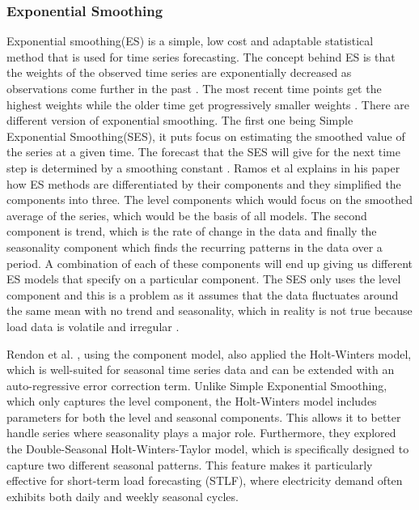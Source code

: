  
 
 \subsubsection{Exponential Smoothing }
 Exponential smoothing(ES) is a simple, low cost and adaptable statistical method that is used for time series forecasting. The concept behind ES is that the weights of the observed time series are exponentially decreased as observations come further in the past \cite{ramos2015performance}.
 The most recent time points get the highest weights while the older time get progressively smaller weights \cite{ramos2015performance}. There are different version of exponential smoothing. The first one being Simple Exponential Smoothing(SES), it puts focus on estimating the smoothed value of the series at a given time. The forecast that the SES will give for the next time step is determined by a smoothing constant \cite{ahmed2020review}. Ramos et al \cite{ramos2015performance} explains in his paper how ES methods are differentiated by their components and they simplified the components into three. The level components which would focus on the smoothed average of the series, which would be the basis of all models. The second component is trend, which is the rate of change in the data and finally the seasonality component which finds the recurring patterns in the data over a period. A combination of each of these components will end up giving us different ES models that specify on a particular component. The SES only uses the level component and this is a problem as it assumes that the data fluctuates around the same mean with no trend and seasonality, which in reality is not true because load data is volatile and irregular \cite{boopathy2024deep}.
 
Rendon et al. \cite{rendon2019structural}, using the component model, also applied the Holt-Winters model, which is well-suited for seasonal time series data and can be extended with an auto-regressive error correction term. Unlike Simple Exponential Smoothing, which only captures the level component, the Holt-Winters model includes parameters for both the level and seasonal components. This allows it to better handle series where seasonality plays a major role. Furthermore, they explored the Double-Seasonal Holt-Winters-Taylor model, which is specifically designed to capture two different seasonal patterns. This feature makes it particularly effective for short-term load forecasting (STLF), where electricity demand often exhibits both daily and weekly seasonal cycles.

